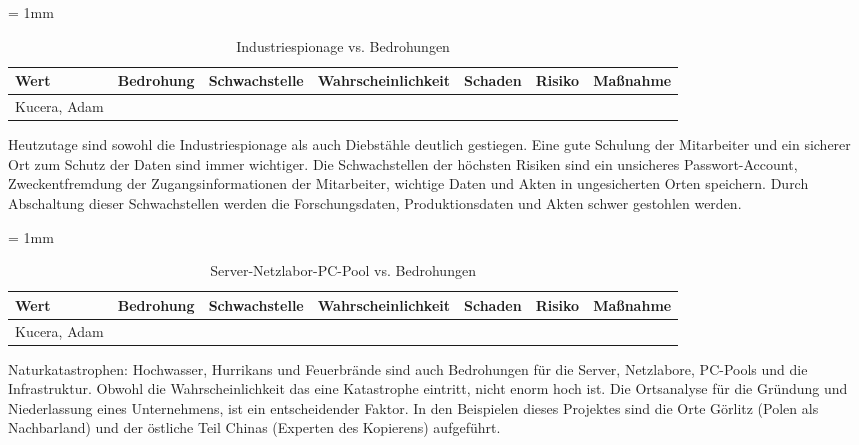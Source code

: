 \begin{table}[H]
	\sffamily
	\caption{Industriespionage vs. Bedrohungen}
	\tabulinesep = 1mm %
	\centering
		\begin{tabu} to 0.9\textwidth {| X[1] | X[1] | X[1] | X[1] | X[1] | X[1] | X[1] |}
		\hline
		\textbf{Wert} & \textbf{Bedrohung} & \textbf{Schwachstelle} & \textbf{Wahrscheinlichkeit} & \textbf{Schaden} & \textbf{Risiko} & \textbf{Maßnahme}\\
		\hline 
		Kucera, Adam &  & & & & &\\
		\hline
	\end{tabu}
\end{table}

Heutzutage sind sowohl die Industriespionage als auch Diebstähle deutlich gestiegen. 
Eine gute Schulung der Mitarbeiter und ein sicherer Ort zum Schutz der Daten sind immer  wichtiger. 
Die Schwachstellen der höchsten Risiken sind ein unsicheres Passwort-Account, Zweckentfremdung der Zugangsinformationen der Mitarbeiter, wichtige Daten und Akten in ungesicherten Orten speichern. Durch Abschaltung dieser Schwachstellen werden die Forschungsdaten, Produktionsdaten und Akten schwer gestohlen werden.

\begin{table}[H]
	\sffamily
	\caption{Server-Netzlabor-PC-Pool vs. Bedrohungen}
	\tabulinesep = 1mm %
	\centering
		\begin{tabu} to 0.9\textwidth {| X[1] | X[1] | X[1] | X[1] | X[1] | X[1] | X[1] |}
		\hline
		\textbf{Wert} & \textbf{Bedrohung} & \textbf{Schwachstelle} & \textbf{Wahrscheinlichkeit} & \textbf{Schaden} & \textbf{Risiko} & \textbf{Maßnahme}\\
		\hline 
		Kucera, Adam &  & & & & &\\
		\hline
	\end{tabu}
\end{table}

Naturkatastrophen: Hochwasser, Hurrikans und Feuerbrände sind auch Bedrohungen für die Server, Netzlabore, PC-Pools und die Infrastruktur. Obwohl die Wahrscheinlichkeit das eine Katastrophe eintritt, nicht enorm hoch ist. 
Die Ortsanalyse für die Gründung und Niederlassung eines Unternehmens, ist ein entscheidender Faktor. In den Beispielen dieses Projektes sind die Orte Görlitz (Polen als Nachbarland) und der östliche Teil Chinas (Experten des Kopierens) aufgeführt.
